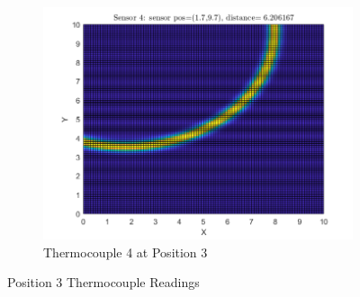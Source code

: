 \documentclass[12pt]{article}
\begin{document}
\begin{figure}[H]
\begin{subfigure}[h]{0.4\textwidth}
        \includegraphics[width=\textwidth]{images/P3S4.png}
        \caption{Thermocouple 4 at Position 3}
        \label{fig:P3S4}
    \end{subfigure}
\caption{Position 3 Thermocouple Readings}
\label{fig:P3}
\end{figure}
\end{document}
